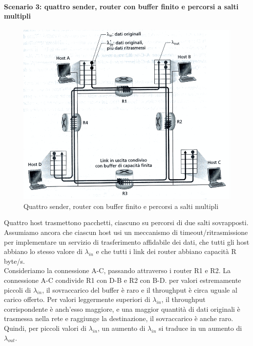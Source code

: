 \documentclass[11pt,a4paper]{book}
\begin{document}
\paragraph{Scenario 3: quattro sender, router con buffer finito e percorsi a salti multipli}
\begin{figure}
	\includegraphics[scale=0.6]{img/043.png}
	\caption{Quattro sender, router con buffer finito e percorsi a salti multipli}
\end{figure}
Quattro host trasmettono pacchetti, ciascuno su percorsi di due salti sovrapposti. Assumiamo ancora che ciascun host usi un meccanismo di timeout/ritrasmissione per implementare un servizio di trasferimento affidabile dei dati, che tutti gli host abbiano lo stesso valore di $\lambda_{in}$ e che tutti i link dei router abbiano capacità R byte/s. \\
Consideriamo la connessione A-C, passando attraverso i router R1 e R2. La connessione A-C condivide R1 con D-B e R2 con B-D. per valori estremamente piccoli di $\lambda_{in}$, il sovraccarico del buffer è raro e il throughput è circa uguale al carico offerto. Per valori leggermente superiori di $\lambda_{in}$, il throughput corrispondente è anch'esso maggiore, e una maggior quantità di dati originali è trasmessa nella rete e raggiunge la destinazione, il sovraccarico è anche raro. Quindi, per piccoli valori di $\lambda_{in}$, un aumento di $\lambda_{in}$ si traduce in un aumento di $\lambda_{out}$. \\
\end{document}
